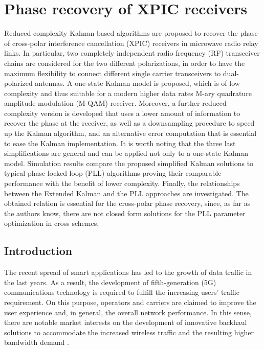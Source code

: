 \chapter{Phase recovery of XPIC receivers
}

Reduced complexity Kalman based algorithms are proposed to recover the phase of cross-polar interference cancellation (XPIC) receivers in microwave radio relay links. In particular, two completely independent radio frequency (RF) transceiver chains are considered for the two different polarizations, in order to have the maximum flexibility to connect different single carrier transceivers to dual-polarized antennas.
A one-state Kalman model is proposed, which is of low complexity and thus suitable for a modern higher data rates M-ary quadrature amplitude modulation (M-QAM) receiver. Moreover, a further reduced complexity version is developed that uses a lower amount of information to recover the phase at the receiver, as well as a downsampling procedure to speed up the Kalman algorithm, and an alternative error computation that is essential to ease the Kalman implementation. It is worth noting that the three last simplifications are general and can be applied not only to a one-state Kalman model.
Simulation results compare the proposed simplified Kalman solutions to typical phase-locked loop (PLL) algorithms proving their comparable performance with the benefit of lower complexity. Finally, the relationships between the Extended Kalman and the PLL approaches are investigated. The obtained relation is essential for the cross-polar phase recovery, since, as far as the authors know, there are not closed form solutions for the PLL parameter optimization in cross schemes.





\section{Introduction}

The recent spread of smart applications has led to the growth of data traffic in the last years.
As a result, the development of fifth-generation (5G) communications technology is required to fulfill the increasing users' traffic requirement. 
On this purpose, operators and carriers are claimed to improve the user experience and, in general, the overall network performance. 
In this sense, there are notable market interests on the development of innovative backhaul solutions to accommodate the increased wireless traffic and the resulting higher bandwidth demand \cite{Xiaohu}.

